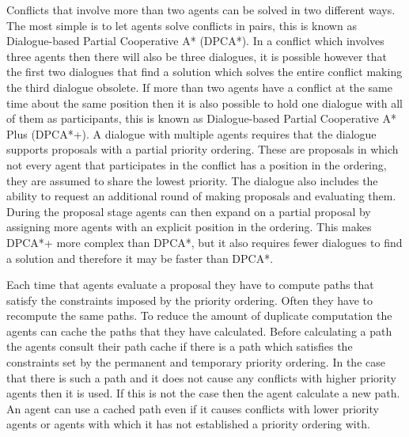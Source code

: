 Conflicts that involve more than two agents can be solved in two different 
ways. The most simple is to let agents solve conflicts in pairs, this is known 
as Dialogue-based Partial Cooperative A* (DPCA*). In a conflict which involves 
three agents then there will also be three dialogues, it is possible however 
that the first two dialogues that find a solution which solves the entire 
conflict making the third dialogue obsolete. If more than two agents have a 
conflict at the same time about the same position then it is also possible to 
hold one dialogue with all of them as participants, this is known as 
Dialogue-based Partial Cooperative A* Plus (DPCA*+). A dialogue with multiple 
agents requires that the dialogue supports proposals with a partial priority 
ordering. These are proposals in which not every agent that participates in the 
conflict has a position in the ordering, they are assumed to share the lowest 
priority. The dialogue also includes the ability to request an additional round 
of making proposals and evaluating them. During the proposal stage agents can 
then expand on a partial proposal by assigning more agents with an explicit 
position in the ordering. This makes DPCA*+ more complex than DPCA*, but it 
also requires fewer dialogues to find a solution and therefore it may be faster 
than DPCA*.

Each time that agents evaluate a proposal they have to compute paths that
satisfy the constraints imposed by the priority ordering. Often they have to 
recompute the same paths. To reduce the amount of duplicate computation the 
agents can cache the paths that they have calculated. Before calculating a path 
the agents consult their path cache if there is a path which satisfies the 
constraints set by the permanent and temporary priority ordering. In the case 
that there is such a path and it does not cause any conflicts with higher 
priority agents then it is used. If this is not the case then the agent 
calculate a new path. An agent can use a cached path even if it causes 
conflicts with lower priority agents or agents with which it has not 
established a priority ordering with.


